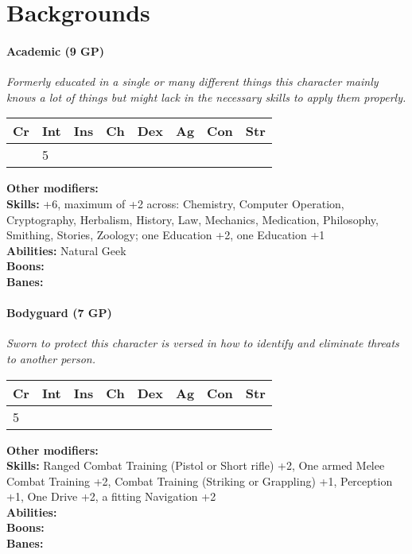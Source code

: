 	\section{Backgrounds}
\label{sec:backgroundlist}
\paragraph*{Academic (9 GP)}
\textit{Formerly educated in a single or many different things this character mainly knows a lot of things but might lack in the necessary skills to apply them properly.}\par
\begin{tabular}{|l|l|l|l|l|l|l|l|}
	\hline
	Cr & Int & Ins & Ch & Dex & Ag & Con & Str \\ \hline
	& 5 &  &  &  &  &  &  \\ \hline
\end{tabular}\par
\noindent\textbf{Other modifiers:} \\
\textbf{Skills:} +6, maximum of +2 across: Chemistry, Computer Operation, Cryptography, Herbalism, History, Law, Mechanics, Medication, Philosophy, Smithing, Stories, Zoology;
one Education +2,
one Education +1\\
\textbf{Abilities:} Natural Geek\\
\textbf{Boons:} \\
\textbf{Banes:} \\

\hrulefill
\paragraph*{Bodyguard (7 GP)}
\textit{Sworn to protect this character is versed in how to identify and eliminate threats to another person.}\par
\begin{tabular}{|l|l|l|l|l|l|l|l|}
	\hline
	Cr & Int & Ins & Ch & Dex & Ag & Con & Str \\ \hline
	5 &  &  &  &  &  &  &  \\ \hline
\end{tabular}\par
\noindent\textbf{Other modifiers:} \\
\textbf{Skills:} Ranged Combat Training (Pistol or Short rifle) +2,
One armed Melee Combat Training +2,
Combat Training (Striking or Grappling) +1,
Perception +1,
One Drive +2,
a fitting Navigation +2\\
\textbf{Abilities:} \\
\textbf{Boons:} \\
\textbf{Banes:} \\

